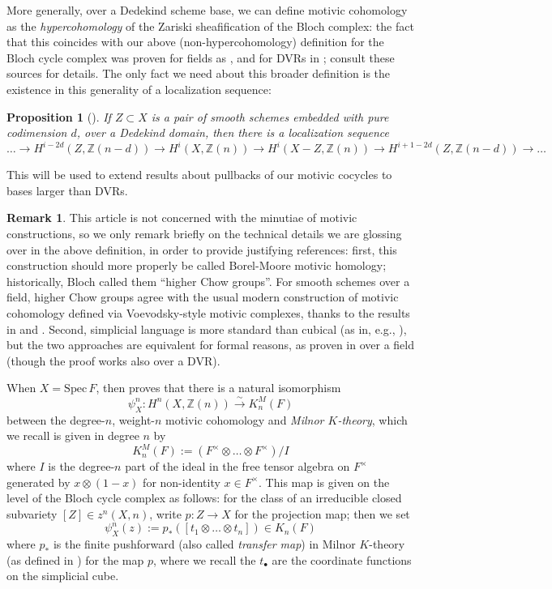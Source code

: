 \documentclass[10pt]{amsart}
\newtheorem{prop}[thm]{Proposition}
\theoremstyle{definition}
\newtheorem{rem}[thm]{Remark}
\newcommand{\Z}{\mathbb{Z}}
\numberwithin{equation}{section}
\begin{document}
    More generally, over a Dedekind scheme base, we can define motivic cohomology as the \emph{hypercohomology} of the Zariski sheafification of the Bloch complex: the fact that this coincides with our above (non-hypercohomology) definition for the Bloch cycle complex was proven for fields as \cite[Corollary 12.2]{FS}, and for DVRs in \cite{Lev2}; consult these sources for details. The only fact we need about this broader definition is the existence in this generality of a localization sequence:

    \begin{prop}[\cite{Geisser}] \label{prop:loc}
        If $Z\subset X$ is a pair of smooth schemes embedded with pure codimension $d$, over a Dedekind domain, then there is a localization sequence
        \[
        \ldots \to H^{i-2d}(Z,\Z(n-d))\to H^i(X,\Z(n)) \to H^i(X-Z, \Z(n)) \to H^{i+1-2d}(Z, \Z(n-d)) \to \ldots 
        \]
    \end{prop}

    This will be used to extend results about pullbacks of our motivic cocycles to bases larger than DVRs.
    
    \begin{rem}
        This article is not concerned with the minutiae of motivic constructions, so we only remark briefly on the technical details we are glossing over in the above definition, in order to provide justifying references: first, this construction should more properly be called Borel-Moore motivic homology; historically, Bloch called them ``higher Chow groups''. For smooth schemes over a field, higher Chow groups agree with the usual modern construction of motivic cohomology defined via Voevodsky-style motivic complexes, thanks to the results in \cite{V} and \cite{FS}. Second, simplicial language is more standard than cubical (as in, e.g., \cite{Geisser}), but the two approaches are equivalent for formal reasons, as proven in \cite{GL} over a field (though the proof works also over a DVR). 
    \end{rem}
    
    When $X=\mathrm{Spec }\,F$, then \cite{Tot} proves that there is a natural isomorphism
    \[
    \psi_{X}^n: H^n(X,\Z(n)) \xrightarrow{\sim} K_n^M(F)
    \]
    between the degree-$n$, weight-$n$ motivic cohomology and \emph{Milnor $K$-theory}, which we recall is given in degree $n$ by 
    \[
    K_n^M(F) := (F^\times \otimes \ldots \otimes F^\times )/ I
    \]
    where $I$ is the degree-$n$ part of the ideal in the free tensor algebra on $F^\times$ generated by $x\otimes (1-x)$ for non-identity $x\in F^\times$. This map is given on the level of the Bloch cycle complex as follows: for the class of an irreducible closed subvariety $[Z]\in z^n(X, n)$, write $p:Z\to X$ for the projection map; then we set 
		\begin{equation}\label{eq:psimap}
			\psi_X^n(z):= p_*([t_1\otimes \ldots \otimes t_{n}]) \in K_{n}(F)
		\end{equation}
	where $p_*$ is the finite pushforward (also called \emph{transfer map}) in Milnor $K$-theory (as defined in \cite[\S5]{BaTa}) for the map $p$, where we recall the $t_\bullet$ are the coordinate functions on the simplicial cube. 
\end{document}

